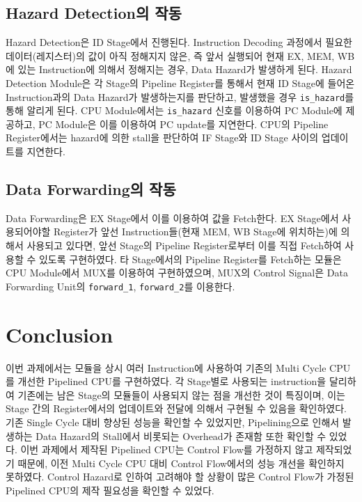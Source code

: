 \documentclass[openright, a4paper]{article}
\newcommand{\code}[1]{\texttt{#1}}
\begin{document}
\subsection{Hazard Detection의 작동}

Hazard Detection은 ID Stage에서 진행된다. 
Instruction Decoding 과정에서 필요한 데이터(레지스터)의 값이 아직 정해지지 않은, 즉 앞서 실행되어 현재 EX, MEM, WB에 있는 Instruction에 의해서 정해지는 경우, Data Hazard가 발생하게 된다. 
Hazard Detection Module은 각 Stage의 Pipeline Register를 통해서 현재 ID Stage에 들어온 Instruction과의 Data Hazard가 발생하는지를 판단하고, 발생했을 경우 \code{is_hazard}를 통해 알리게 된다.
CPU Module에서는 \code{is_hazard} 신호를 이용하여 PC Module에 제공하고, PC Module은 이를 이용하여 PC update를 지연한다. CPU의 Pipeline Register에서는 hazard에 의한 stall을 판단하여 IF Stage와 ID Stage 사이의 업데이트를 지연한다.

\subsection{Data Forwarding의 작동}

Data Forwarding은 EX Stage에서 이를 이용하여 값을 Fetch한다.
EX Stage에서 사용되어야할 Register가 앞선 Instruction들(현재 MEM, WB Stage에 위치하는)에 의해서 사용되고 있다면, 앞선 Stage의 Pipeline Register로부터 이를 직접 Fetch하여 사용할 수 있도록 구현하였다.
타 Stage에서의 Pipeline Register를 Fetch하는 모듈은 CPU Module에서 MUX를 이용하여 구현하였으며, MUX의 Control Signal은 Data Forwarding Unit의 \code{forward_1}, \code{forward_2}를 이용한다.


\section{Conclusion}

이번 과제에서는 모듈을 상시 여러 Instruction에 사용하여 기존의 Multi Cycle CPU를 개선한 Pipelined CPU를 구현하였다.
각 Stage별로 사용되는 instruction을 달리하여 기존에는 남은 Stage의 모듈들이 사용되지 않는 점을 개선한 것이 특징이며, 이는 Stage 간의 Register에서의 업데이트와 전달에 의해서 구현될 수 있음을 확인하였다. 
기존 Single Cycle 대비 향상된 성능을 확인할 수 있었지만, Pipelining으로 인해서 발생하는 Data Hazard의 Stall에서 비롯되는 Overhead가 존재함 또한 확인할 수 있었다. 
이번 과제에서 제작된 Pipelined CPU는 Control Flow를 가정하지 않고 제작되었기 때문에, 이전 Multi Cycle CPU 대비 Control Flow에서의 성능 개선을 확인하지 못하였다. 
Control Hazard로 인하여 고려해야 할 상황이 많은 Control Flow가 가정된 Pipelined CPU의 제작 필요성을 확인할 수 있었다.
\end{document}
